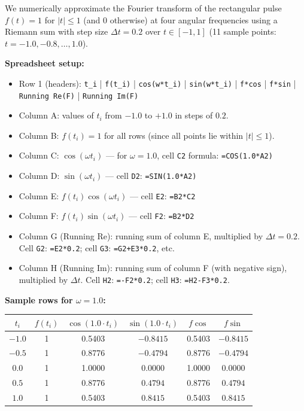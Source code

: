 \documentclass[12pt,a4paper]{article}
\begin{document}
We numerically approximate the Fourier transform of the rectangular pulse
$f(t) = 1$ for $|t| \leq 1$ (and $0$ otherwise) at four angular frequencies using a Riemann sum
with step size $\Delta t = 0.2$ over $t \in [-1, 1]$ (11 sample points: $t = -1.0, -0.8, \ldots, 1.0$).

\textbf{Spreadsheet setup:}
\begin{itemize}
  \item Row 1 (headers): \texttt{t\_i} | \texttt{f(t\_i)} | \texttt{cos(w*t\_i)} | \texttt{sin(w*t\_i)} | \texttt{f*cos} | \texttt{f*sin} | \texttt{Running Re(F)} | \texttt{Running Im(F)}
  \item Column A: values of $t_i$ from $-1.0$ to $+1.0$ in steps of $0.2$.
  \item Column B: $f(t_i) = 1$ for all rows (since all points lie within $|t| \leq 1$).
  \item Column C: $\cos(\omega t_i)$ --- for $\omega = 1.0$, cell \texttt{C2} formula: \texttt{=COS(1.0*A2)}
  \item Column D: $\sin(\omega t_i)$ --- cell \texttt{D2}: \texttt{=SIN(1.0*A2)}
  \item Column E: $f(t_i)\cos(\omega t_i)$ --- cell \texttt{E2}: \texttt{=B2*C2}
  \item Column F: $f(t_i)\sin(\omega t_i)$ --- cell \texttt{F2}: \texttt{=B2*D2}
  \item Column G (Running Re): running sum of column E, multiplied by $\Delta t = 0.2$.
        Cell \texttt{G2}: \texttt{=E2*0.2}; cell \texttt{G3}: \texttt{=G2+E3*0.2}, etc.
  \item Column H (Running Im): running sum of column F (with negative sign), multiplied by $\Delta t$.
        Cell \texttt{H2}: \texttt{=-F2*0.2}; cell \texttt{H3}: \texttt{=H2-F3*0.2}.
\end{itemize}

\textbf{Sample rows for $\omega = 1.0$:}
\vspace{0.4em}

\begin{tabular}{@{} c c c c c c @{}}
\toprule
$t_i$ & $f(t_i)$ & $\cos(1.0\cdot t_i)$ & $\sin(1.0\cdot t_i)$ & $f\cos$ & $f\sin$ \\
\midrule
$-1.0$ & 1 & 0.5403 & $-0.8415$ & 0.5403 & $-0.8415$ \\
$-0.5$ & 1 & 0.8776 & $-0.4794$ & 0.8776 & $-0.4794$ \\
$ 0.0$ & 1 & 1.0000 & $ 0.0000$ & 1.0000 & $ 0.0000$ \\
$ 0.5$ & 1 & 0.8776 & $ 0.4794$ & 0.8776 & $ 0.4794$ \\
$ 1.0$ & 1 & 0.5403 & $ 0.8415$ & 0.5403 & $ 0.8415$ \\
\bottomrule
\end{tabular}
\end{document}
